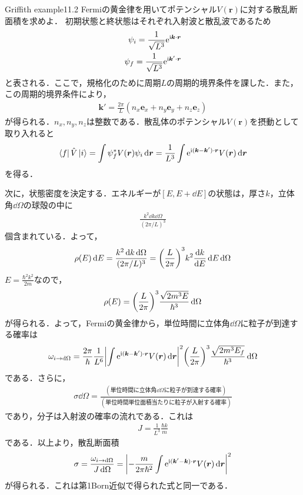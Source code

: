 \documentclass{report}
\begin{document}
  \begin{myex}{Griffith example11.2}{}
    Fermiの黄金律を用いてポテンシャル$V(\bm{r})$に対する散乱断面積を求めよ．
    \tcblower
    初期状態と終状態はそれぞれ入射波と散乱波であるため
    \begin{align}
      \psi_i = \frac{1}{\sqrt{L^3}} \mathrm{e}^{\mathrm{i} \bm{k}\cdot\bm{r}}\\
      \psi_f = \frac{1}{\sqrt{L^3}} \mathrm{e}^{\mathrm{i} \bm{k}'\cdot\bm{r}}
    \end{align}
    と表される．ここで，規格化のために周期$L$の周期的境界条件を課した．また，この周期的境界条件により，
    \begin{align}
      \bm{k}' = \frac{2\pi}{L}(n_x \bm{e}_x + n_y \bm{e}_y + n_z \bm{e}_z)
    \end{align}
    が得られる．$n_x,n_y,n_z$は整数である．散乱体のポテンシャル$V(\bm{r})$を摂動として取り入れると
    \begin{align}
      \bra{f}\hat{V}\ket{i} = \int \psi_f^{*}V(\bm{r})\psi_i \dd{\bm{r}} = \frac{1}{L^3} \int \mathrm{e}^{\mathrm{i}(\bm{k} - \bm{k}')\cdot \bm{r}} V(\bm{r}) \dd{\bm{r}}
    \end{align}
    を得る．

    次に，状態密度を決定する．エネルギーが$[E,E+\dd{E}]$の状態は，厚さ$k$，立体角$\dd{\Omega}$の球殻の中に
    \begin{align}
      \frac{k^2 \dd{k} \dd{\Omega}}{(2\pi/L)^3}
    \end{align}
    個含まれている．よって，
    \begin{align}
      \rho(E) \dd{E} = \frac{k^2 \dd{k} \dd{\Omega}}{(2\pi/L)^3} = \qty(\frac{L}{2\pi})^3 k^2 \dv{k}{E} \dd{E} \dd{\Omega}
    \end{align}
    $E= \frac{\hbar^2 k^2}{2m}$なので，
    \begin{align}
      \rho(E) = \qty(\frac{L}{2\pi})^3 \frac{\sqrt{2m^3E}}{\hbar^3} \dd{\Omega}
    \end{align}
    が得られる．よって，Fermiの黄金律から，単位時間に立体角$\dd{\Omega}$に粒子が到達する確率は
    \begin{align}
      \omega_{i\to\dd{\Omega}} = \frac{2\pi}{\hbar} \frac{1}{L^6} \abs{\int \mathrm{e}^{\mathrm{i}(\bm{k} - \bm{k}')\cdot \bm{r}} V(\bm{r}) \dd{\bm{r}}}^2 \qty(\frac{L}{2\pi})^3 \frac{\sqrt{2m^3E_f}}{\hbar^3} \dd{\Omega}
    \end{align}
    である．さらに，
    \begin{align}
      \sigma \dd{\Omega} = \frac{(\text{単位時間に立体角$\dd{\Omega}$に粒子が到達する確率})}{(単位時間単位面積当たりに粒子が入射する確率)}
    \end{align}
    であり，分子は入射波の確率の流れである．これは
    \begin{align}
      J = \frac{1}{L^3}\frac{\hbar k}{m}
    \end{align}
    である．以上より，散乱断面積
    \begin{align}
      \sigma = \frac{\omega_{i\to\dd{\Omega}}}{J \dd{\Omega}} = \abs{-\frac{m}{2\pi\hbar^2}\int \mathrm{e}^{\mathrm{i}(\bm{k}' - \bm{k})\cdot\bm{r}}V(\bm{r})\dd{\bm{r}}}^2
     \end{align}
     が得られる．これは第1Born近似で得られた式と同一である．
  \end{myex}
\end{document}
